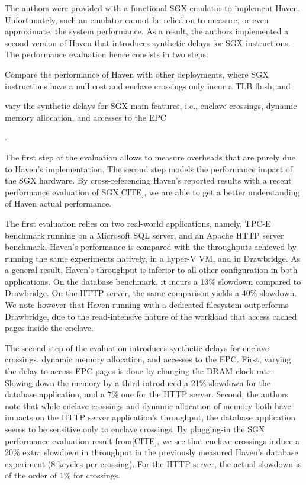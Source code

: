 The authors were provided with a functional SGX emulator to implement Haven.
Unfortunately, such an emulator cannot be relied on to measure, or even approximate, the system performance.
As a result, the authors implemented a second version of Haven that introduces synthetic delays for SGX instructions.
The performance evaluation hence consists in two steps:
\begin{enumerate*}
	\item Compare the performance of Haven with other deployments, where SGX instructions have a null cost and enclave crossings only incur a TLB flush, and
	\item vary the synthetic delays for SGX main features, i.e., enclave crossings, dynamic memory allocation, and accesses to the EPC
\end{enumerate*}.

The first step of the evaluation allows to measure overheads that are purely due to Haven's implementation.
The second step models the performance impact of the SGX hardware.
By cross-referencing Haven's reported results with a recent performance evaluation of SGX[CITE], we are able to get a better understanding of Haven actual performance.

The first evaluation relies on two real-world applications, namely, TPC-E benchmark running on a Microsoft SQL server, and an Apache HTTP server benchmark.
Haven's performance is compared with the throughputs achieved by running the same experiments natively, in a hyper-V VM, and in Drawbridge.
As a general result, Haven's throughput is inferior to all other configuration in both applications.
On the database benchmark, it incurs a 13\% slowdown compared to Drawbridge.
On the HTTP server, the same comparison yields a 40\% slowdown.
We note however that Haven running with a dedicated filesystem outperforms Drawbridge, due to the read-intensive nature of the workload that access cached pages inside the enclave.

The second step of the evaluation introduces synthetic delays for enclave crossings, dynamic memory allocation, and accesses to the EPC.
First, varying the delay to access EPC pages is done by changing the DRAM clock rate.
Slowing down the memory by a third introduced a 21\% slowdown for the database application, and a 7\% one for the HTTP server.
Second, the authors note that while enclave crossings and dynamic allocation of memory both have impacts on the HTTP server application's throughput, the database application seems to be sensitive only to enclave crossings.
By plugging-in the SGX performance evaluation result from[CITE], we see that enclave crossings induce a 20\% extra slowdown in throughput in the previously measured Haven's database experiment (8 kcycles per crossing).
For the HTTP server, the actual slowdown is of the order of 1\% for crossings.

